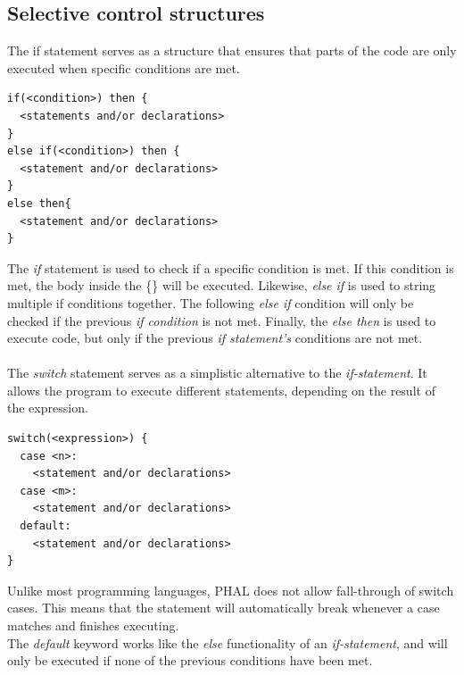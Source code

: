 \subsection{Selective control structures}
The if statement serves as a structure that ensures that parts of the code are only executed when specific conditions are met.
\begin{lstlisting}[caption={Example of an \textit{If} statement},label={code:If-statement}]
if(<condition>) then {
  <statements and/or declarations>
}
else if(<condition>) then {
  <statement and/or declarations>
}
else then{
  <statement and/or declarations>
}
\end{lstlisting}
The \textit{if} statement is used to check if a specific condition is met. If this condition is met, the body inside the \{\} will be executed. Likewise, \textit{else if} is used to string multiple if conditions together. The following \textit{else if} condition will only be checked if the previous \textit{if condition} is not met. 
Finally, the \textit{else then} is used to execute code, but only if the previous \textit{if statement's} conditions are not met.
\\\\
The \textit{switch} statement serves as a simplistic alternative to the \textit{if-statement}. It allows the program to execute different statements, depending on the result of the expression. 
\begin{lstlisting}[caption={Example of a \textit{Switch} statement},label={code:Switch-statement}]
switch(<expression>) {
  case <n>:
    <statement and/or declarations>
  case <m>:
    <statement and/or declarations>
  default:
    <statement and/or declarations>
}
\end{lstlisting}
Unlike most programming languages, PHAL does not allow fall-through of switch cases. This means that the statement will automatically break whenever a case matches and finishes executing.
\\
The \textit{default} keyword works like the \textit{else} functionality of an \textit{if-statement}, and will only be executed if none of the previous conditions have been met.

